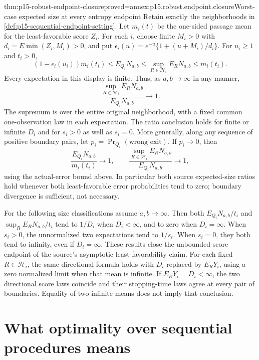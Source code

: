\begin{hbtheorem}{thm:p15-robust-endpoint-closure}{proved=annex:p15.robust.endpoint.closure}{Worst-case expected size at every entropy endpoint}
Retain exactly the neighborhoods in
\cref{def:p15-sequential-endpoint-setting}. Let \(m_i(t)\) be the
one-sided passage mean for the least-favorable score \(Z_i\).
For each \(i\), choose finite \(M_i>0\) with
\(d_i=E\min(Z_i,M_i)>0\), and put
\(\epsilon_i(u)=e^{-u}\{1+(u+M_i)/d_i\}\).
For \(u_i\geq1\) and \(t_i>0\),
\[
 (1-\epsilon_i(u_i))m_i(t_i)
 \leq E_{Q_i}N_{a,b}
 \leq \sup_{R\in\mathcal H_i}E_RN_{a,b}
 \leq m_i(t_i).
\]
Every expectation in this display is finite.
Thus, as \(a,b\to\infty\) in any manner,
\[
 \frac{\sup_{R\in\mathcal H_i}E_RN_{a,b}}{E_{Q_i}N_{a,b}}
 \longrightarrow1 .
\]
The supremum is over the entire original neighborhood, with a fixed
common one-observation law in each expectation.
The ratio conclusion holds for finite or infinite \(D_i\) and
for \(s_i>0\) as well as \(s_i=0\).
More generally, along any sequence of positive boundary pairs, let
\(p_i=\Pr_{Q_i}(\text{wrong exit})\). If \(p_i\to0\), then
\[
 \frac{E_{Q_i}N_{a,b}}{m_i(t_i)}\longrightarrow1,\qquad
 \frac{\sup_{R\in\mathcal H_i}E_RN_{a,b}}{E_{Q_i}N_{a,b}}
                    \longrightarrow1,
\]
using the actual-error bound above. In particular both source
expected-size ratios hold whenever both least-favorable error
probabilities tend to zero; boundary divergence is sufficient,
not necessary.

For the following size classifications assume \(a,b\to\infty\).
Then both \(E_{Q_i}N_{a,b}/t_i\) and
\(\sup_R E_RN_{a,b}/t_i\) tend to \(1/D_i\) when \(D_i<\infty\),
and to zero when \(D_i=\infty\).
When \(s_i>0\), the unnormalized two expectations tend to \(1/s_i\).
When \(s_i=0\), they both tend to infinity, even if \(D_i=\infty\).
These results close the unbounded-score endpoint of the source's
asymptotic least-favorability claim.
For each fixed \(R\in\mathcal H_i\), the same directional formula holds
with \(D_i\) replaced by \(E_RY_i\), using a zero normalized limit
when that mean is infinite. If \(E_RY_i=D_i<\infty\), the two
directional score laws coincide and their stopping-time laws agree
at every pair of boundaries. Equality of two infinite means does
not imply that conclusion.
\end{hbtheorem}

\section{What optimality over sequential procedures means}
\label{sec:p15-sequential-cost-minimax}

